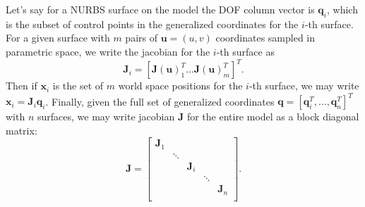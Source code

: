 Let's say for a NURBS surface on the model the DOF column vector is $\mathbf{q}_i$, which is the subset of control points in the generalized coordinates for the $i$-th surface. For a given surface with $m$ pairs of $\mathbf{u}=(u,v)$ coordinates sampled in parametric space, we write the jacobian for the $i$-th surface as 
\begin{equation}
\label{eqn:surface_jacobian}
    \mathbf{J}_i =
    \left[ \mathbf{J}(\mathbf{u})_1^T \dots \mathbf{J}(\mathbf{u})_m^T \right]^T
    \text{.}
\end{equation}
Then if $\mathbf{x}_i$ is the set of $m$ world space positions for the $i$-th surface, we may write $\mathbf{x}_i = \mathbf{J}_i \mathbf{q}_i$. Finally, given the full set of generalized coordinates $\mathbf{q} = \left[ \mathbf{q}_i^T, \dots, \mathbf{q}_n^T \right]^T$ with $n$ surfaces, we may write jacobian $\mathbf{J}$ for the entire model as a block diagonal matrix:
\begin{equation}
\mathbf{J} = \left[ \begin{array}{ccccc}
\mathbf{J}_1 &  &  &  &  \\
 & \ddots &  &  &  \\
 &  & \mathbf{J}_i & &  \\
 &  &  & \ddots &  \\
 &  &  &  & \mathbf{J}_n \\
\end{array} \right]
\text{.}
\end{equation}

